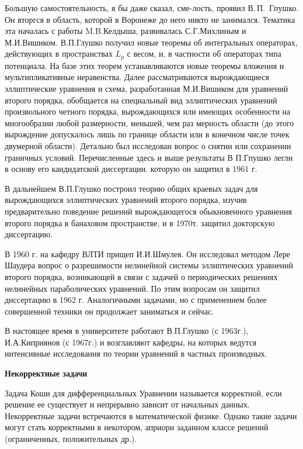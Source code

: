 Большую самостоятельность, я бы даже сказал,
сме-\linebreak лость,
проявил В.\,П.~Гпушко.
Он вторгся в область, которой в Воронеже до него никто не занимался. Тематика эта началась с работы M.B.Келдыша, развивалась С.Г.Михлиным и М.И.Вишиком. В.П.Глушко получил новые теоремы об интегральных операторах, действующих в пространствах  $L_p$ с весом, и, в частности об операторах типа потенциала. На базе этих теорем устанавливаются новые теоремы вложения и мультипликативные неравенства. Далее рассматриваются вырождающиеся эллиптические уравнения и схема, разработанная М.И.Вишиком для уравнений второго порядка, обобщается на специальный вид эллиптических уравнений произвольного четного порядка, вырождающихся или имеющих особенности на многообразии любой размерности, меньшей, чем раз мерность области (до этого вырождение допускалось лишь по границе области или в конечном числе точек двумерной области). Детально был исследован вопрос о снятии или сохранении граничных условий. Перечисленные здесь и выше результаты В П.Гпушко легли в основу его кандидатской диссертации. которую он защитил в 1961 г.

В дальнейшем В.П.Глушко построил теорию общих краевых задач для вырождающихся эллиптических уравнений второго порядка, изучив предварительно поведение решений вырождающегося обыкновенного уравнения второго порядка в банаховом пространстве, и в 1970т. защитил докторскую диссертацию.

В 1960 г. на кафедру ВЛТИ прищеп И.И.Шмулев. Он исследовал методом Лере Шаудера вопрос о разрешимости нелинейной системы эллиптических уравнений второго порядка, возникающей в связи с задачей о периодических решениях нелинейных параболических уравнений. По этим вопросам он защитил диссертацию в 1962 г. Аналогичными задачами, но с применением более совершенной техники он продолжает заниматься и сейчас.

В настоящее время в университете работают В.П.Глушко (с 1963г.), И.А.Киприянов (с 1967г.) и возглавляют кафедры, на которых ведутся интенсивные исследования по теории уравнений в частных производных.

{\bf Некорректные задачи}

Задача Коши для дифференциальных Уравнении называется корректной, если решение ее существует и непрерывно зависит от начальных данных. Некорректные задачи встречаются в математической физике. Однако такие задачи могут стать корректными в некотором, априори заданном классе решений (ограниченных, положительных др.).

